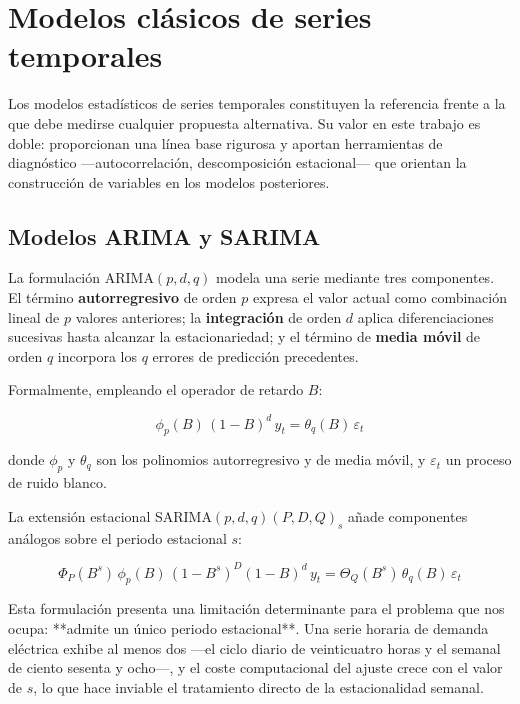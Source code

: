 
\section{Modelos clásicos de series temporales}

Los modelos estadísticos de series temporales constituyen la referencia frente a
la que debe medirse cualquier propuesta alternativa. Su valor en este trabajo es
doble: proporcionan una línea base rigurosa y aportan herramientas de diagnóstico
—autocorrelación, descomposición estacional— que orientan la construcción de
variables en los modelos posteriores.

\subsection{Modelos ARIMA y SARIMA}

La formulación ARIMA$(p,d,q)$ \parencite{boxjenkins} modela una serie mediante
tres componentes. El término \textbf{autorregresivo} de orden $p$ expresa el valor
actual como combinación lineal de $p$ valores anteriores; la \textbf{integración}
de orden $d$ aplica diferenciaciones sucesivas hasta alcanzar la estacionariedad;
y el término de \textbf{media móvil} de orden $q$ incorpora los $q$ errores de
predicción precedentes.

Formalmente, empleando el operador de retardo $B$:

\begin{equation}
\phi_p(B)\,(1-B)^d\, y_t = \theta_q(B)\,\varepsilon_t
\end{equation}

donde $\phi_p$ y $\theta_q$ son los polinomios autorregresivo y de media móvil, y
$\varepsilon_t$ un proceso de ruido blanco.

La extensión estacional SARIMA$(p,d,q)(P,D,Q)_s$ añade componentes análogos sobre
el periodo estacional $s$:

\begin{equation}
\Phi_P(B^s)\,\phi_p(B)\,(1-B^s)^D (1-B)^d\, y_t
  = \Theta_Q(B^s)\,\theta_q(B)\,\varepsilon_t
\end{equation}

Esta formulación presenta una limitación determinante para el problema que nos
ocupa: **admite un único periodo estacional**. Una serie horaria de demanda
eléctrica exhibe al menos dos —el ciclo diario de veinticuatro horas y el semanal
de ciento sesenta y ocho—, y el coste computacional del ajuste crece con el valor
de $s$, lo que hace inviable el tratamiento directo de la estacionalidad semanal.

